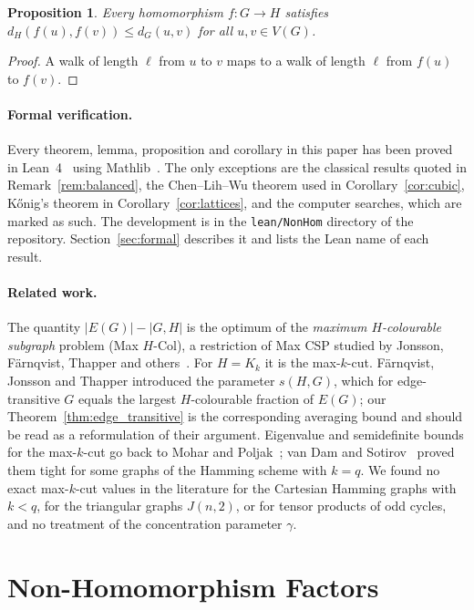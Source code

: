 \documentclass{article}
\newtheorem{proposition}[theorem]{Proposition}
\theoremstyle{definition}
\begin{document}
\begin{proposition}
\label{prop:hom_contracts}
Every homomorphism $f\colon G\to H$ satisfies $d_H(f(u),f(v))\le d_G(u,v)$ for
all $u,v\in V(G)$.
\end{proposition}

\begin{proof}
A walk of length $\ell$ from $u$ to $v$ maps to a walk of length $\ell$ from
$f(u)$ to $f(v)$.
\end{proof}

\paragraph{Formal verification.}
Every theorem, lemma, proposition and corollary in this paper has been proved in
Lean~4~\cite{lean4} using Mathlib~\cite{mathlib}.  The only exceptions are the
classical results quoted in Remark~\ref{rem:balanced}, the Chen--Lih--Wu
theorem used in Corollary~\ref{cor:cubic}, K\H{o}nig's theorem in
Corollary~\ref{cor:lattices}, and the computer searches, which are marked as such.  The development is in
the \texttt{lean/NonHom} directory of the repository.
Section~\ref{sec:formal} describes it and lists the Lean name of each result.

\paragraph{Related work.}
The quantity $|E(G)|-|G,H|$ is the optimum of the \emph{maximum $H$-colourable
subgraph} problem (Max $H$-Col), a restriction of Max CSP studied by Jonsson,
F\"arnqvist, Thapper and others~\cite{fjt2009,efjt2009}.  For $H=K_k$ it is the
max-$k$-cut.  F\"arnqvist, Jonsson and Thapper introduced the parameter
$s(H,G)$, which for edge-transitive $G$ equals the largest $H$-colourable
fraction of $E(G)$; our Theorem~\ref{thm:edge_transitive} is the corresponding
averaging bound and should be read as a reformulation of their argument.
Eigenvalue and semidefinite bounds for the max-$k$-cut go back to Mohar and
Poljak~\cite{mohar1990}; van Dam and Sotirov~\cite{vandam2016} proved them tight
for some graphs of the Hamming scheme with $k=q$.  We found no exact max-$k$-cut
values in the literature for the Cartesian Hamming graphs with $k<q$, for the
triangular graphs $J(n,2)$, or for tensor products of odd cycles, and no
treatment of the concentration parameter $\gamma$.

\section{Non-Homomorphism Factors}
\end{document}
